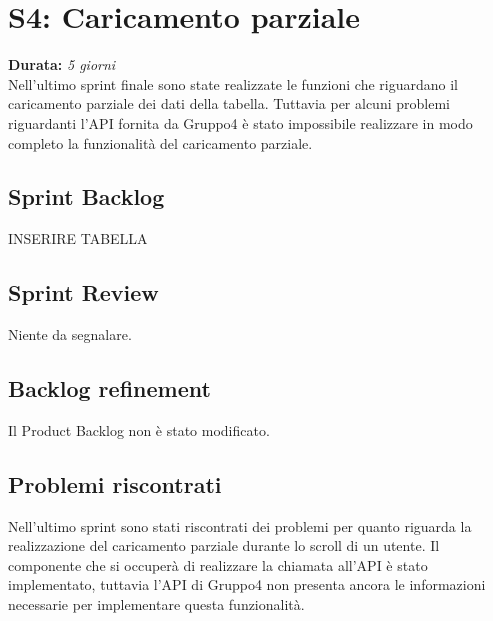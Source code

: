 \newpage

\section{S4: Caricamento parziale}
\textbf{Durata:} \textit{5 giorni} \\
Nell'ultimo sprint finale sono state realizzate le funzioni che riguardano il caricamento parziale dei dati della tabella. Tuttavia per alcuni problemi riguardanti l'API fornita da Gruppo4 è stato impossibile realizzare in modo completo la funzionalità del caricamento parziale.

\subsection{Sprint Backlog}
INSERIRE TABELLA
\subsection{Sprint Review}
Niente da segnalare.
\subsection{Backlog refinement}
Il Product Backlog non è stato modificato.

\subsection{Problemi riscontrati}
Nell'ultimo sprint sono stati riscontrati dei problemi per quanto riguarda la realizzazione del caricamento parziale durante lo scroll di un utente. Il componente che si occuperà di realizzare la chiamata all'API è stato implementato, tuttavia l'API di Gruppo4 non presenta ancora le informazioni necessarie per implementare questa funzionalità.
